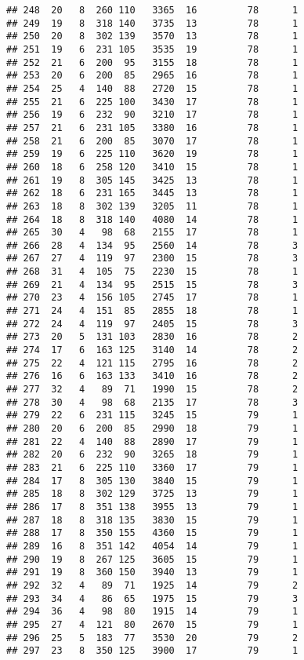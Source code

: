 \documentclass[]{article}
\begin{document}
\begin{verbatim}
## 248  20   8  260 110   3365  16         78      1
## 249  19   8  318 140   3735  13         78      1
## 250  20   8  302 139   3570  13         78      1
## 251  19   6  231 105   3535  19         78      1
## 252  21   6  200  95   3155  18         78      1
## 253  20   6  200  85   2965  16         78      1
## 254  25   4  140  88   2720  15         78      1
## 255  21   6  225 100   3430  17         78      1
## 256  19   6  232  90   3210  17         78      1
## 257  21   6  231 105   3380  16         78      1
## 258  21   6  200  85   3070  17         78      1
## 259  19   6  225 110   3620  19         78      1
## 260  18   6  258 120   3410  15         78      1
## 261  19   8  305 145   3425  13         78      1
## 262  18   6  231 165   3445  13         78      1
## 263  18   8  302 139   3205  11         78      1
## 264  18   8  318 140   4080  14         78      1
## 265  30   4   98  68   2155  17         78      1
## 266  28   4  134  95   2560  14         78      3
## 267  27   4  119  97   2300  15         78      3
## 268  31   4  105  75   2230  15         78      1
## 269  21   4  134  95   2515  15         78      3
## 270  23   4  156 105   2745  17         78      1
## 271  24   4  151  85   2855  18         78      1
## 272  24   4  119  97   2405  15         78      3
## 273  20   5  131 103   2830  16         78      2
## 274  17   6  163 125   3140  14         78      2
## 275  22   4  121 115   2795  16         78      2
## 276  16   6  163 133   3410  16         78      2
## 277  32   4   89  71   1990  15         78      2
## 278  30   4   98  68   2135  17         78      3
## 279  22   6  231 115   3245  15         79      1
## 280  20   6  200  85   2990  18         79      1
## 281  22   4  140  88   2890  17         79      1
## 282  20   6  232  90   3265  18         79      1
## 283  21   6  225 110   3360  17         79      1
## 284  17   8  305 130   3840  15         79      1
## 285  18   8  302 129   3725  13         79      1
## 286  17   8  351 138   3955  13         79      1
## 287  18   8  318 135   3830  15         79      1
## 288  17   8  350 155   4360  15         79      1
## 289  16   8  351 142   4054  14         79      1
## 290  19   8  267 125   3605  15         79      1
## 291  19   8  360 150   3940  13         79      1
## 292  32   4   89  71   1925  14         79      2
## 293  34   4   86  65   1975  15         79      3
## 294  36   4   98  80   1915  14         79      1
## 295  27   4  121  80   2670  15         79      1
## 296  25   5  183  77   3530  20         79      2
## 297  23   8  350 125   3900  17         79      1

\end{verbatim}
\end{document}
